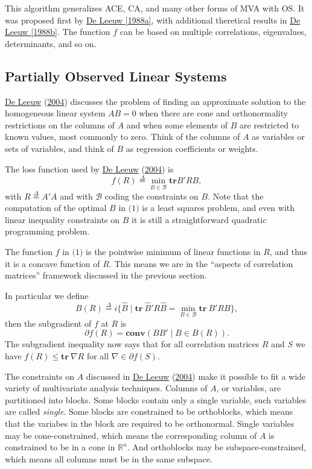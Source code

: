 \documentclass[
  12pt,
]{book}
\begin{document}
This algorithm generalizes ACE, CA, and many other forms of MVA with OS. It was proposed first by \href{}{De Leeuw {[}1988a{]}}, with additional theretical results in \href{}{De Leeuw {[}1988b{]}}. The function \(f\) can be based
on multiple correlations, eigenvalues, determinants, and so on.

\hypertarget{partially-observed-linear-systems}{%
\subsection{Partially Observed Linear Systems}\label{partially-observed-linear-systems}}

\protect\hyperlink{ref-deleeuw_C_04a}{De Leeuw} (\protect\hyperlink{ref-deleeuw_C_04a}{2004}) discusses the problem of finding an approximate solution to the homogeneous linear system \(AB=0\) when there are cone and orthonormality restrictions on the columns of \(A\) and when some elements of \(B\) are restricted to known values, most commonly to zero. Think of the columns of \(A\) as variables or sets of variables, and think of \(B\) as regression coefficients or weights.

The loss function used by \protect\hyperlink{ref-deleeuw_C_04a}{De Leeuw} (\protect\hyperlink{ref-deleeuw_C_04a}{2004}) is
\[
f(R)\mathop{=}\limits^{\Delta}\min_{B\in\mathcal{B}}\mathbf{tr} B'RB,\tag{1}
\]
with \(R\mathop{=}\limits^{\Delta}A'A\) and with \(\mathcal{B}\) coding the constraints on \(B\). Note that the computation of the optimal \(B\) in \(\text{(1)}\) is a least squares problem, and even with linear inequality constraints on \(B\) it is still a straightforward quadratic programming problem.

The function \(f\) in \(\text{(1)}\) is the pointwise minimum of linear functions in \(R\), and thus it is a concave function of \(R\).
This means we are in the ``aspects of correlation matrices'' framework discussed in the previous section.

In particular we define
\[
B(R)\mathop{=}\limits^{\Delta}i\{\hat B\mid\mathbf{tr}\ \hat B'R\hat B=\min_{B\in\mathcal{B}}\mathbf{tr}\ B'RB\},
\]
then the subgradient of \(f\) at \(R\) is
\[
\partial f(R)=\mathbf{conv}(BB'\mid B\in B(R)).
\]
The subgradient inequality now says that for all correlation matrices \(R\) and \(S\) we have \(f(R)\leq \mathbf{tr}\ \nabla R\)
for all \(\nabla\in\partial f(S)\).

The constraints on \(A\) discussed in \protect\hyperlink{ref-deleeuw_C_04a}{De Leeuw} (\protect\hyperlink{ref-deleeuw_C_04a}{2004}) make it possible to fit a wide variety of multivariate analysis techniques. Columns of \(A\), or variables, are partitioned into blocks. Some blocks contain only a single variable, such variables are called \emph{single}. Some blocks are constrained to be orthoblocks, which means that the variabes in the block are required to be orthonormal. Single variables may be cone-constrained, which means the corresponding column of \(A\) is
constrained to be in a cone in \(\mathbb{R}^n\). And orthoblocks may be subspace-constrained, which means all columns must be in the same subspace.
\end{document}
